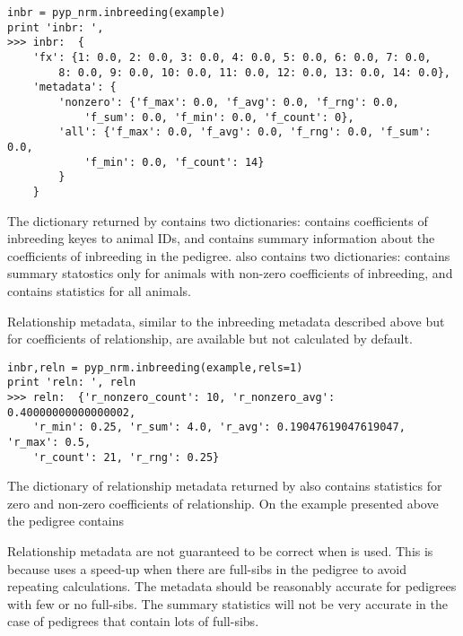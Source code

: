 \begin{verbatim}
inbr = pyp_nrm.inbreeding(example)
print 'inbr: ', 
>>> inbr:  {
    'fx': {1: 0.0, 2: 0.0, 3: 0.0, 4: 0.0, 5: 0.0, 6: 0.0, 7: 0.0,
        8: 0.0, 9: 0.0, 10: 0.0, 11: 0.0, 12: 0.0, 13: 0.0, 14: 0.0},
    'metadata': {
        'nonzero': {'f_max': 0.0, 'f_avg': 0.0, 'f_rng': 0.0,
            'f_sum': 0.0, 'f_min': 0.0, 'f_count': 0},
        'all': {'f_max': 0.0, 'f_avg': 0.0, 'f_rng': 0.0, 'f_sum': 0.0,
            'f_min': 0.0, 'f_count': 14}
        }
    }
\end{verbatim}
The dictionary returned by  contains two dictionaries:  contains coefficients of inbreeding keyes to animal IDs, and  contains summary information about the coefficients of inbreeding in the pedigree.  also contains two dictionaries:  contains summary statostics only for animals with non-zero coefficients of inbreeding, and  contains statistics for all animals.

Relationship metadata, similar to the inbreeding metadata described above but for coefficients of relationship, are available but not calculated by default. 
\begin{verbatim}
inbr,reln = pyp_nrm.inbreeding(example,rels=1)
print 'reln: ', reln
>>> reln:  {'r_nonzero_count': 10, 'r_nonzero_avg': 0.40000000000000002,
    'r_min': 0.25, 'r_sum': 4.0, 'r_avg': 0.19047619047619047, 'r_max': 0.5,
    'r_count': 21, 'r_rng': 0.25}
\end{verbatim}
The dictionary of relationship metadata returned by  also contains statistics for zero and non-zero coefficients of relationship. On the example presented above the pedigree contains 

Relationship metadata are not guaranteed to be correct when  is used. This is because  uses a speed-up when there are full-sibs in the pedigree to avoid repeating calculations. The metadata should be reasonably accurate for pedigrees with few or no full-sibs. The summary statistics will not be very accurate in the case of pedigrees that contain lots of full-sibs.

